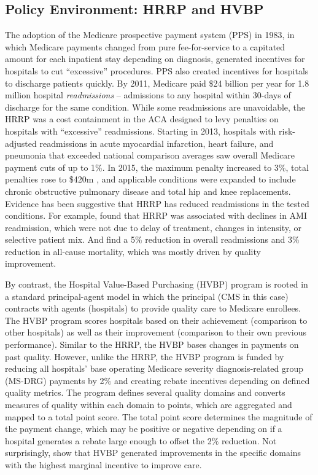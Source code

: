 \documentclass[12pt]{article}
\begin{document}
\subsection{Policy Environment: HRRP and HVBP}
The adoption of the Medicare prospective payment system (PPS) in 1983, in which Medicare payments changed from pure fee-for-service to a capitated amount for each inpatient stay depending on diagnosis, generated incentives for hospitals to cut ``excessive'' procedures. PPS also created incentives for hospitals to discharge patients quickly.  By 2011, Medicare paid $\$$24 billion per year for 1.8 million hospital \textit{readmissions} -- admissions to any hospital within 30-days of discharge for the same condition.  While some readmissions are unavoidable, the HRRP was a cost containment in the ACA designed to levy penalties on hospitals with ``excessive'' readmissions.  Starting in 2013, hospitals with risk-adjusted readmissions in acute myocardial infarction, heart failure, and pneumonia that exceeded national comparison averages saw overall Medicare payment cuts of up to 1$\%$.   In 2015, the maximum penalty increased to 3\%, total penalties rose to \$420m \cite{rau2015}, and applicable conditions were expanded to include chronic obstructive pulmonary disease and total hip and knee replacements.  Evidence has been suggestive that HRRP has reduced readmissions in the tested conditions.  For example, \cite{mellor2016} found that HRRP was associated with declines in AMI readmission, which were not due to delay of treatment, changes in intensity, or selective patient mix. And \cite{gupta2017} find a 5$\%$ reduction in overall readmissions and 3$\%$ reduction in all-cause mortality, which was mostly driven by quality improvement.

By contrast, the Hospital Value-Based Purchasing (HVBP) program is rooted in a standard principal-agent model in which the principal (CMS in this case) contracts with agents (hospitals) to provide quality care to Medicare enrollees. The HVBP program scores hospitals based on their achievement (comparison to other hospitals) as well as their improvement (comparison to their own previous performance).  Similar to the HRRP, the HVBP bases changes in payments on past quality.  However, unlike the HRRP, the HVBP program is funded by reducing all hospitals' base operating Medicare severity diagnosis-related group (MS-DRG) payments by 2$\%$ and creating rebate incentives depending on defined quality metrics.  The program defines several quality domains and converts measures of quality within each domain to points, which are aggregated and mapped to a total point score.  The total point score determines the magnitude of the payment change, which may be positive or negative depending on if a hospital generates a rebate large enough to offset the 2$\%$ reduction.  Not surprisingly, \cite{norton2017} show that HVBP generated improvements in the specific domains with the highest marginal incentive to improve care.
\end{document}
